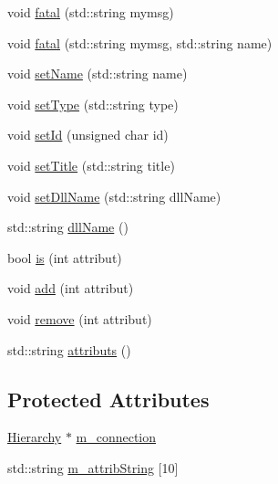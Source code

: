 \begin{DoxyCompactItemize}
void \hyperlink{classObject_aad5a16aac7516ce65bd5ec02ab07fc80}{fatal} (std::string mymsg)
\item 
void \hyperlink{classObject_ae62acd3d09f716220f75f252dc38bc9a}{fatal} (std::string mymsg, std::string name)
\item 
void \hyperlink{classObject_ae30fea75683c2d149b6b6d17c09ecd0c}{setName} (std::string name)
\item 
void \hyperlink{classObject_aae534cc9d982bcb9b99fd505f2e103a5}{setType} (std::string type)
\item 
void \hyperlink{classObject_a398fe08cba594a0ce6891d59fe4f159f}{setId} (unsigned char id)
\item 
void \hyperlink{classObject_a89557dbbad5bcaa02652f5d7fa35d20f}{setTitle} (std::string title)
\item 
void \hyperlink{classObject_a870c5af919958c2136623b2d7816d123}{setDllName} (std::string dllName)
\item 
std::string \hyperlink{classObject_a2e3947f2870094c332d7454117f3ec63}{dllName} ()
\item 
bool \hyperlink{classAttrib_a704f26af560909ad22065083bb7d4c34}{is} (int attribut)
\item 
void \hyperlink{classAttrib_a235f773af19c900264a190b00a3b4ad7}{add} (int attribut)
\item 
void \hyperlink{classAttrib_a7d4ef7e32d93cb287792b87b857e79f3}{remove} (int attribut)
\item 
std::string \hyperlink{classAttrib_aee7bbf16b144887f196e1341b24f8a26}{attributs} ()
\end{DoxyCompactItemize}
\subsection*{Protected Attributes}
\begin{DoxyCompactItemize}
\item 
\hyperlink{classHierarchy}{Hierarchy} $\ast$ \hyperlink{classElement_abe3de7a5dbbc9a6dd2d7e012e5fdb266}{m\_\-connection}
\item 
std::string \hyperlink{classAttrib_a3414521d7a82476e874b25a5407b5e63}{m\_\-attribString} \mbox{[}10\mbox{]}
\end{DoxyCompactItemize}
